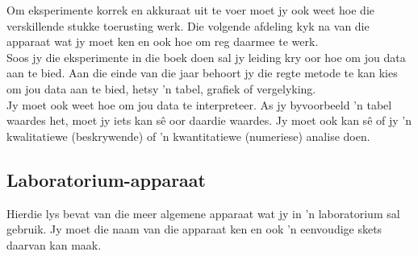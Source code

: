 Om eksperimente korrek en akkuraat uit te voer moet jy ook weet hoe die verskillende stukke toerusting werk. Die volgende afdeling kyk na van die apparaat wat jy moet ken en ook hoe om reg daarmee te werk. \\
Soos jy die eksperimente in die boek doen sal jy leiding kry oor hoe om jou data aan te bied. Aan die einde van die jaar behoort jy die regte metode te kan kies om jou data aan te bied, hetsy  'n tabel, grafiek of vergelyking.\\
Jy moet ook weet hoe om jou data te interpreteer. As jy byvoorbeeld  'n tabel waardes het, moet jy iets kan sê oor daardie waardes. Jy moet ook kan sê of jy  'n kwalitatiewe (beskrywende) of  'n kwantitatiewe (numeriese) analise doen.
\subsection*{Laboratorium-apparaat}
Hierdie lys bevat van die meer algemene apparaat wat jy in  'n laboratorium sal gebruik. Jy moet die naam van die apparaat ken en ook  'n eenvoudige skets daarvan kan maak.
